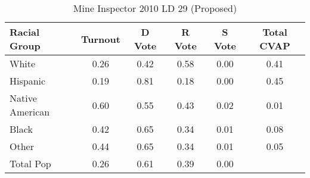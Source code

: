 \begin{table}[htb]
\begin{center}
\caption{Mine Inspector 2010 LD 29 (Proposed)}
\label{smine_cvap_ld_29}
\begin{tabular}{lccccc}
  \hline
Racial Group & Turnout & D Vote & R Vote & S Vote & Total CVAP \\ 
  \hline
White & 0.26 & 0.42 & 0.58 & 0.00 & 0.41 \\ 
  Hispanic & 0.19 & 0.81 & 0.18 & 0.00 & 0.45 \\ 
  Native American & 0.60 & 0.55 & 0.43 & 0.02 & 0.01 \\ 
  Black & 0.42 & 0.65 & 0.34 & 0.01 & 0.08 \\ 
  Other & 0.44 & 0.65 & 0.34 & 0.01 & 0.05 \\ 
  Total Pop & 0.26 & 0.61 & 0.39 & 0.00 &  \\ 
   \hline
\end{tabular}
\end{center}
\end{table}
